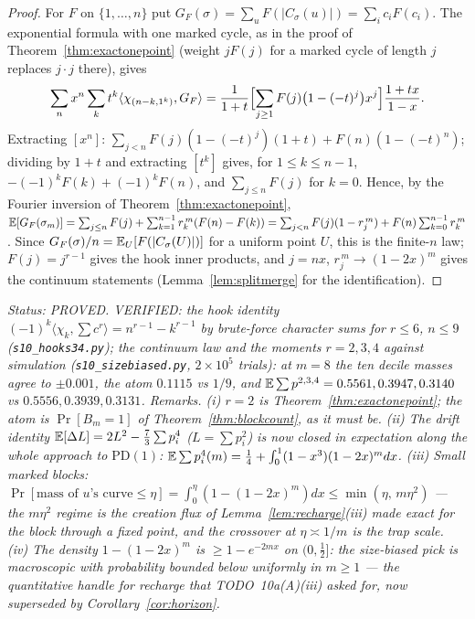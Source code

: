 \begin{proof}
For $F$ on $\{1,\dots,n\}$ put $G_F(\sigma)=\sum_{u}F(|C_\sigma(u)|)
=\sum_ic_iF(c_i)$.  The exponential formula with one marked cycle, as
in the proof of Theorem~\ref{thm:exactonepoint} (weight $jF(j)$ for a
marked cycle of length $j$ replaces $j\cdot j$ there), gives
\[
\sum_nx^n\sum_kt^k\langle\chi_{(n-k,1^k)},G_F\rangle
=\frac1{1+t}\Bigl[\sum_{j\ge1}F(j)\bigl(1-(-t)^j\bigr)x^j\Bigr]\frac{1+tx}{1-x}.
\]
Extracting $[x^n]$: $\sum_{j<n}F(j)(1-(-t)^j)(1+t)+F(n)(1-(-t)^n)$;
dividing by $1+t$ and extracting $[t^k]$ gives, for $1\le k\le n-1$,
$-(-1)^kF(k)+(-1)^kF(n)$, and $\sum_{j\le n}F(j)$ for $k=0$.  Hence,
by the Fourier inversion of Theorem~\ref{thm:exactonepoint},
$\mathbb{E}[G_F(\sigma_m)]=\sum_{j\le n}F(j)+\sum_{k=1}^{n-1}r_k^{\,m}(F(n)-F(k))
=\sum_{j<n}F(j)(1-r_j^{\,m})+F(n)\sum_{k=0}^{n-1}r_k^{\,m}$.  Since
$G_F(\sigma)/n=\mathbb{E}_U[F(|C_\sigma(U)|)]$ for a uniform point $U$, this is
the finite-$n$ law; $F(j)=j^{r-1}$ gives the hook inner products, and
$j=nx$, $r_j^{\,m}\to(1-2x)^m$ gives the continuum statements
(Lemma~\ref{lem:splitmerge} for the identification).
\end{proof}

\emph{Status: PROVED.  VERIFIED: the hook identity
$(-1)^k\langle\chi_k,\sum c^r\rangle=n^{r-1}-k^{r-1}$ by brute-force
character sums for $r\le6$, $n\le9$ (\texttt{s10\_hooks34.py}); the
continuum law and the moments $r=2,3,4$ against simulation
(\texttt{s10\_sizebiased.py}, $2\times10^5$ trials): at $m=8$ the ten
decile masses agree to $\pm0.001$, the atom $0.1115$ vs $1/9$, and
$\mathbb{E}\sum p^{2,3,4}=0.5561,0.3947,0.3140$ vs $0.5556,0.3939,0.3131$.
Remarks.  (i) $r=2$ is Theorem~\ref{thm:exactonepoint}; the atom is
$\Pr[B_m=1]$ of Theorem~\ref{thm:blockcount}, as it must be.  (ii) The
drift identity $\mathbb{E}[\Delta L]=2L^2-\tfrac73\sum p_i^4$ ($L=\sum p_i^2$)
is now closed in expectation along the whole approach to
$\mathrm{PD}(1)$: $\mathbb{E}\sum p_i^4(m)=\tfrac14+\int_0^1(1-x^3)(1-2x)^mdx$.
(iii) Small marked blocks: $\Pr[\text{mass of }u\text{'s curve}\le\eta]
=\int_0^\eta(1-(1-2x)^m)dx\le\min(\eta,\,m\eta^2)$ --- the
$m\eta^2$ regime is the creation flux of Lemma~\ref{lem:recharge}(iii)
made exact for the block through a fixed point, and the crossover at
$\eta\asymp1/m$ is the trap scale.  (iv) The density $1-(1-2x)^m$ is
$\ge1-e^{-2mx}$ on $(0,\tfrac12]$: the size-biased pick is macroscopic with probability
bounded below uniformly in $m\ge1$ --- the quantitative handle for
recharge that TODO~10a(A)(iii) asked for, now superseded by
Corollary~\ref{cor:horizon}.}

